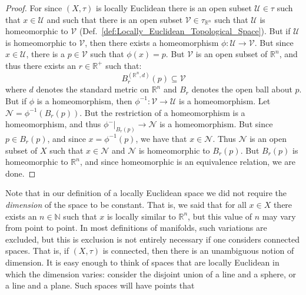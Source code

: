     \begin{proof}
        For since $(X,\tau)$ is locally Euclidean there is an open subset
        $\mathcal{U}\in\tau$ such that $x\in\mathcal{U}$ and such that there is
        an open subset $\mathcal{V}\in\tau_{\mathbb{R}^{n}}$ such that
        $\mathcal{U}$ is homeomorphic to $\mathcal{V}$
        (Def.~\ref{def:Locally_Euclidean_Topological_Space}). But if
        $\mathcal{U}$ is homeomorphic to $\mathcal{V}$, then there exists a
        homeomorphism $\phi:\mathcal{U}\rightarrow\mathcal{V}$. But since
        $x\in\mathcal{U}$, there is a $p\in\mathcal{V}$ such that $\phi(x)=p$.
        But $\mathcal{V}$ is an open subset of $\mathbb{R}^{n}$, and thus there
        exists an $r\in\mathbb{R}^{+}$ such that:
        \begin{equation}
            B_{r}^{(\mathbb{R}^{n},d)}(p)\subseteq\mathcal{V}
        \end{equation}
        where $d$ denotes the standard metric on $\mathbb{R}^{n}$ and $B_{r}$
        denotes the open ball about $p$. But if $\phi$ is a homeomorphism, then
        $\phi^{\minus{1}}:\mathcal{V}\rightarrow\mathcal{U}$ is a homeomorphism.
        Let $\mathcal{N}=\phi^{\minus{1}}(B_{r}(p))$. 
        But the restriction of a homeomorphism is a homeomorphism, and thus
        $\phi^{\minus}|_{B_{r}(p)}\rightarrow\mathcal{N}$ is a homeomorphism.
        But since $p\in{B}_{r}(p)$, and since $x=\phi^{\minus{1}}(p)$, we have
        that $x\in\mathcal{N}$. Thus $\mathcal{N}$ is an open subset of
        $X$ such that $x\in\mathcal{N}$ and $\mathcal{N}$ is homeomorphic to
        $B_{r}(p)$. But $B_{r}(p)$ is homeomorphic to $\mathbb{R}^{n}$, and
        since homeomorphic is an equivalence relation, we are done.
    \end{proof}
    Note that in our definition of a locally Euclidean space we did not require
    the \textit{dimension} of the space to be constant. That is, we said that
    for all $x\in{X}$ there exists an $n\in\mathbb{N}$ such that $x$ is locally
    similar to $\mathbb{R}^{n}$, but this value of $n$ may vary from point to
    point. In most definitions of manifolds, such variations are excluded, but
    this is exclusion is not entirely necessary if one considers connected
    spaces. That is, if $(X,\tau)$ is connected, then there is an unambiguous
    notion of dimension. It is easy enough to think of spaces that are locally
    Euclidean in which the dimension varies: consider the disjoint union of a
    line and a sphere, or a line and a plane. Such spaces will have points that
